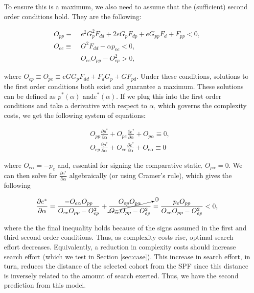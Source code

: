 To ensure this is a maximum, we also need to assume that the (sufficient) second order conditions hold. They are the following:

\begin{align}
O_{pp} \equiv &\;  e^2G_p^2F_{dd} + 2eG_pF_{dp} + eG_{pp}F_d + F_{pp} < 0, \nonumber \\
O_{ee}  \equiv &\;  G^2F_{dd} - \alpha p_{ee} < 0, \nonumber \\
&  \; O_{ee}O_{pp} - O_{ep}^2 > 0, \nonumber
\end{align}

\noindent where $O_{ep} \equiv O_{pe} \equiv eGG_pF_{dd} + F_dG_p + GF_{pd}$. Under these conditions, solutions to the first order conditions both exist and guarantee a maximum. These solutions can be defined as $p^*(\alpha)$ and$e^*(\alpha)$. If we plug this into the first order conditions and take a derivative with respect to $\alpha$, which governs the complexity costs, we get the following system of equations:

\begin{align}
& O_{pp}\frac{\partial p^*}{\partial \alpha} + O_{pe}\frac{\partial e^*}{\partial \alpha} + O_{p\alpha} \equiv 0, \nonumber \\
& O_{ep}\frac{\partial p^*}{\partial \alpha} + O_{ee}\frac{\partial e^*}{\partial \alpha} + O_{e\alpha} \equiv 0  \nonumber
\end{align}

\noindent where $O_{e\alpha} = -p_e$ and, essential for signing the comparative static, $O_{p\alpha} = 0$. We can then solve for $\frac{\partial e^*}{\partial \alpha}$ algebraically (or using Cramer's rule), which gives the following

\begin{equation}
\frac{\partial e^*}{\partial \alpha} = \frac{-O_{e\alpha}O_{pp}}{O_{ee}O_{pp} - O_{ep}^2} + \cancelto{0}{\frac{O_{ep}O_{p\alpha}}{O_{ee}O_{pp} - O_{ep}^2}} = \frac{p_eO_{pp}}{O_{ee}O_{pp} - O_{ep}^2} < 0, \label{eq:comp_stat}
\end{equation}

\noindent where the the final inequality holds because of the signs assumed in the first and third second order conditions.  Thus, as complexity costs rise, optimal search effort decreases. Equivalently, a reduction in complexity costs should increase search effort (which we test in Section \ref{sec:case}). This increase in search effort, in turn, reduces the distance of the selected cohort from the SPF since this distance is inversely related to the amount of search exerted. Thus, we have the second prediction from this model. \\

